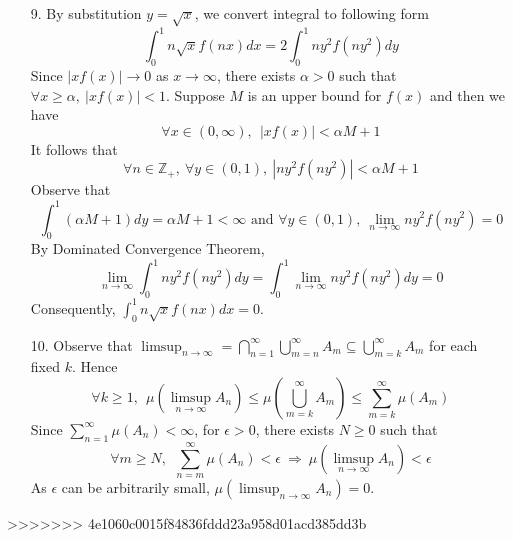 \begin{itemize}
	\item[9.] By substitution $y= \sqrt{x}$, we convert integral to following form
	$$
	\int_{0}^1 n\sqrt{x}f(nx)dx = 2\int_{0}^1 ny^2f(ny^2)dy
	$$ 
	Since $\lvert xf(x)\rvert \rightarrow 0$ as $x\rightarrow \infty$, there exists $\alpha >0$ such that $\forall x\ge \alpha,~\lvert xf(x)\rvert<1$. Suppose $M$ is an upper bound for $f(x)$ and then we have
	\[
	\forall x\in (0,\infty),~~|xf(x)| < \alpha M+1
	\] 
	It follows that
	\[
	\forall n\in\mathbb{Z}_+,~\forall y\in (0,1),~\left\lvert ny^2f(ny^2)\right\rvert < \alpha M+1
	\]
	Observe that $$\int_{0}^1(\alpha M+1)dy = \alpha M+1 < \infty \text{ and }\forall y\in (0,1),~\lim_{n\rightarrow\infty}ny^2f(ny^2) = 0$$ By Dominated Convergence Theorem, 
	\[
	\lim_{n\rightarrow\infty}\int_{0}^1 ny^2f(ny^2)dy = \int_{0}^1 \lim_{n\rightarrow\infty}ny^2f(ny^2)dy = 0
	\]
	Consequently, $\int_{0}^1n\sqrt{x}f(nx)dx = 0$.
	\item[10.] Observe that $\limsup_{n\rightarrow \infty} = \bigcap_{n=1}^\infty \bigcup_{m=n}^\infty A_m \subseteq \bigcup_{m=k}^\infty A_m$ for each fixed $k$.
	Hence
	$$
	\forall k\ge 1,~~\mu\left(\limsup_{n\rightarrow \infty}A_n\right)\le \mu\left(\bigcup_{m=k}^\infty A_m\right) \le \sum_{m=k}^\infty \mu\left(A_m\right)
	$$
	Since $\sum_{n=1}^\infty \mu\left(A_n\right) < \infty$, for $\epsilon >0$, there exists $N\ge 0$ such that
	$$
	\forall m\ge N,~~\sum_{n=m}^\infty \mu\left(A_n\right) < \epsilon ~\Rightarrow~ \mu\left(\limsup_{n\rightarrow \infty}A_n\right)<\epsilon
	$$
	As $\epsilon$ can be arbitrarily small, $\mu\left(\limsup_{n\rightarrow \infty}A_n\right) = 0$.
\end{itemize}
>>>>>>> 4e1060c0015f84836fddd23a958d01acd385dd3b
